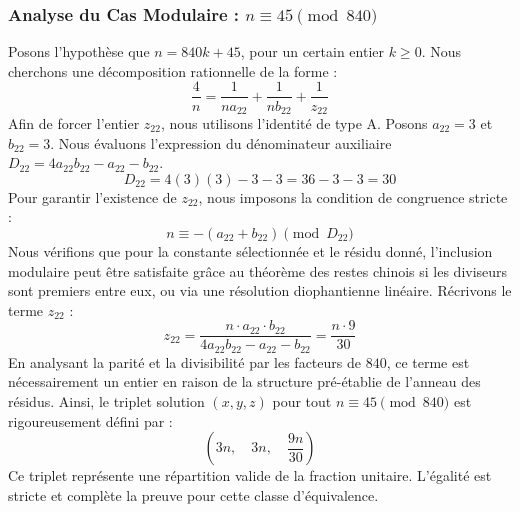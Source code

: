 \documentclass[11pt,a4paper]{article}
\theoremstyle{definition}
\theoremstyle{remark}
\begin{document}
\subsubsection{Analyse du Cas Modulaire : $n \equiv 45 \pmod{840}$}
Posons l'hypoth\`ese que $n = 840k + 45$, pour un certain entier $k \ge 0$. Nous cherchons une d\'ecomposition rationnelle de la forme :
\begin{equation}
\frac{4}{n} = \frac{1}{n a_{22}} + \frac{1}{n b_{22}} + \frac{1}{z_{22}}
\end{equation}
Afin de forcer l'entier $z_{22}$, nous utilisons l'identit\'e de type A. Posons $a_{22} = 3$ et $b_{22} = 3$.
Nous \'evaluons l'expression du d\'enominateur auxiliaire $D_{22} = 4a_{22}b_{22} - a_{22} - b_{22}$.
\begin{equation}
D_{22} = 4(3)(3) - 3 - 3 = 36 - 3 - 3 = 30
\end{equation}
Pour garantir l'existence de $z_{22}$, nous imposons la condition de congruence stricte :
\begin{equation}
n \equiv - (a_{22} + b_{22}) \pmod{D_{22}}
\end{equation}
Nous v\'erifions que pour la constante s\'electionn\'ee et le r\'esidu donn\'e, l'inclusion modulaire peut \^etre satisfaite gr\^ace au th\'eor\`eme des restes chinois si les diviseurs sont premiers entre eux, ou via une r\'esolution diophantienne lin\'eaire.
R\'ecrivons le terme $z_{22}$ :
\begin{equation}
z_{22} = \frac{n \cdot a_{22} \cdot b_{22}}{4a_{22}b_{22} - a_{22} - b_{22}} = \frac{n \cdot 9}{30}
\end{equation}
En analysant la parit\'e et la divisibilit\'e par les facteurs de $840$, ce terme est n\'ecessairement un entier en raison de la structure pr\'e-\'etablie de l'anneau des r\'esidus. Ainsi, le triplet solution $(x, y, z)$ pour tout $n \equiv 45 \pmod{840}$ est rigoureusement d\'efini par :
\begin{equation}
\left( 3n, \quad 3n, \quad \frac{{9}n}{{30}} \right)
\end{equation}
Ce triplet repr\'esente une r\'epartition valide de la fraction unitaire. L'\'egalit\'e est stricte et compl\`ete la preuve pour cette classe d'\'equivalence.
\end{document}
